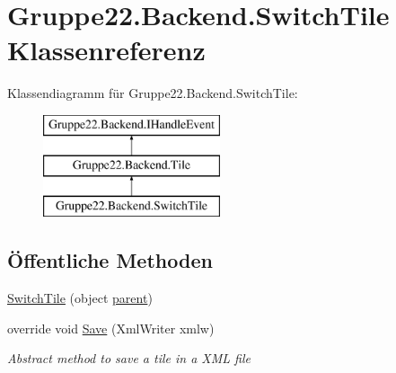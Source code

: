 \hypertarget{class_gruppe22_1_1_backend_1_1_switch_tile}{\section{Gruppe22.\-Backend.\-Switch\-Tile Klassenreferenz}
\label{class_gruppe22_1_1_backend_1_1_switch_tile}
}
Klassendiagramm für Gruppe22.\-Backend.\-Switch\-Tile\-:\begin{figure}[H]
\begin{center}
\leavevmode
\includegraphics[height=3.000000cm]{class_gruppe22_1_1_backend_1_1_switch_tile}
\end{center}
\end{figure}
\subsection*{Öffentliche Methoden}
\begin{DoxyCompactItemize}
\item 
\hyperlink{class_gruppe22_1_1_backend_1_1_switch_tile_a661354802865cb1432b44c0b6864d95f}{Switch\-Tile} (object \hyperlink{class_gruppe22_1_1_backend_1_1_tile_abc12933c70eb3a2ebbb2fde9f45c2632}{parent})
\item 
override void \hyperlink{class_gruppe22_1_1_backend_1_1_switch_tile_aa50a0cf7dde944e73b9b2640042e78d2}{Save} (Xml\-Writer xmlw)
\begin{DoxyCompactList}\small\item\em Abstract method to save a tile in a X\-M\-L file \end{DoxyCompactList}\end{DoxyCompactItemize}
